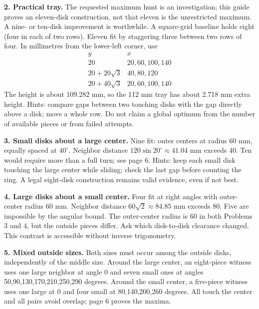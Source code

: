 \documentclass[11pt]{article}
\begin{document}
\textbf{2. Practical tray.} The requested maximum hunt is an investigation; this guide proves an eleven-disk construction, not that eleven is the unrestricted maximum. A nine- or ten-disk improvement is worthwhile. A square-grid baseline holds eight (four in each of two rows). Eleven fit by staggering three between two rows of four. In millimetres from the lower-left corner, use
\[
\begin{array}{c|c}
y&x\\\hline
20&20,60,100,140\\
20+20\sqrt 3&40,80,120\\
20+40\sqrt 3&20,60,100,140
\end{array}
\]
The height is about 109.282 mm, so the 112 mm tray has about 2.718 mm extra height. Hints: compare gaps between two touching disks with the gap directly above a disk; move a whole row. Do not claim a global optimum from the number of available pieces or from failed attempts.

\textbf{3. Small disks about a large center.} Nine fit: outer centers at radius 60 mm, equally spaced at $40^\circ$. Neighbor distance $120\sin 20^\circ\approx 41.04$ mm exceeds 40. Ten would require more than a full turn; see page 6. Hints: keep each small disk touching the large center while sliding; check the last gap before counting the ring. A legal eight-disk construction remains valid evidence, even if not best.

\textbf{4. Large disks about a small center.} Four fit at right angles with outer-center radius 60 mm. Neighbor distance $60\sqrt 2\approx 84.85$ mm exceeds 80. Five are impossible by the angular bound. The outer-center radius is 60 in both Problems 3 and 4, but the outside pieces differ. Ask which disk-to-disk clearance changed. This contrast is accessible without inverse trigonometry.

\textbf{5. Mixed outside sizes.} Both sizes must occur among the outside disks, independently of the middle size. Around the large center, an eight-piece witness uses one large neighbor at angle 0 and seven small ones at angles 50,90,130,170,210,250,290 degrees. Around the small center, a five-piece witness uses one large at 0 and four small at 80,140,200,260 degrees. All touch the center and all pairs avoid overlap; page 6 proves the maxima.
\end{document}
